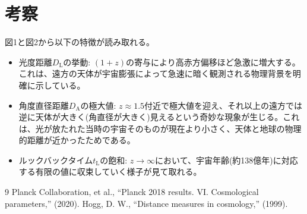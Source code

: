 \documentclass[dvipdfmx]{jlreq}
\begin{document}
\section{考察}
図1と図2から以下の特徴が読み取れる。
\begin{itemize}
    \item 光度距離$D_{\mathrm{L}}$の挙動: $(1+z)$の寄与により高赤方偏移ほど急激に増大する。これは、遠方の天体が宇宙膨張によって急速に暗く観測される物理背景を明確に示している。
    \item 角度直径距離$D_{\mathrm{A}}$の極大値: $z \approx 1.5$付近で極大値を迎え、それ以上の遠方では逆に天体が大きく(角直径が大きく)見えるという奇妙な現象が生じる。これは、光が放たれた当時の宇宙そのものが現在より小さく、天体と地球の物理的距離が近かったためである。
    \item ルックバックタイム$t_{\mathrm{L}}$の飽和: $z \to \infty$において、宇宙年齢(約138億年)に対応する有限の値に収束していく様子が見て取れる。
\end{itemize}

\begin{thebibliography}{9}
 Planck Collaboration, et al., ``Planck 2018 results. VI. Cosmological parameters,'' (2020).
 Hogg, D. W., ``Distance measures in cosmology,'' (1999).
\end{thebibliography}
\end{document}
